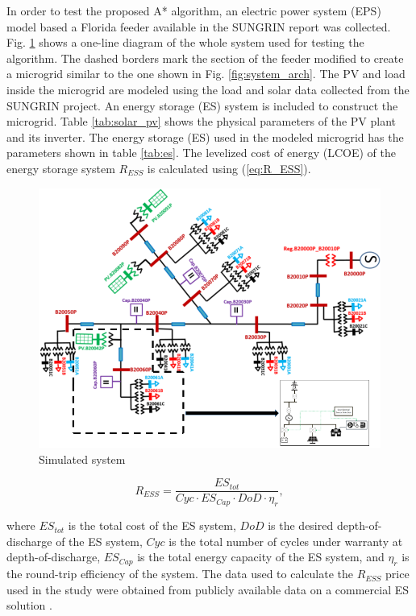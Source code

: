 In order to test the proposed A* algorithm, an electric power system (EPS) model based a Florida feeder available in the SUNGRIN report \cite{SUNGRIN} was collected. Fig. \ref{fig:simulation_grid} shows a one-line diagram of the whole system used for testing the algorithm. The dashed borders mark the section of the feeder modified to create a microgrid similar to the one shown in Fig. \ref{fig:system_arch}. The PV and load inside the microgrid are modeled using the load and solar data collected from the SUNGRIN project. An energy storage (ES) system is included to construct the microgrid. Table \ref{tab:solar_pv} shows the physical parameters of the PV plant and its inverter. The energy storage (ES) used in the modeled microgrid has the parameters shown in table \ref{tab:es}. The levelized cost of energy (LCOE)  of the energy storage system $R_{ESS}$ is calculated using (\ref{eq:R_ESS}).

\begin{figure}[!ht]
    \centering
    \includegraphics[width = \linewidth]{figs/A8/simulation_grid.png}
    \caption{Simulated system}
    \label{fig:simulation_grid}
\end{figure}


\begin{equation}
\label{eq:R_ESS}
R_{ESS} = \dfrac{ES_{tot}}{Cyc\cdot ES_{Cap}\cdot DoD\cdot \eta_{r}},
\end{equation}

where $ES_{tot}$ is the total cost of the ES system, $DoD$ is the desired depth-of-discharge of the ES system, $Cyc$ is the total number of cycles under warranty at depth-of-discharge, $ES_{Cap}$ is the total energy capacity of the ES system, and $\eta_r$ is the round-trip efficiency of the system. The data used to calculate the $R_{ESS}$ price used in the study were obtained from publicly available data on a commercial ES solution \cite{tesla_powerpack_2018}. 

